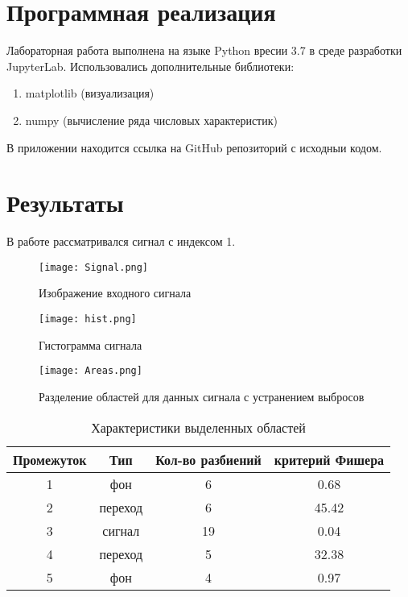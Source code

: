 \documentclass{article}
\begin{document}
\section{Программная реализация}
\noindent Лабораторная работа выполнена на языке Python вресии 3.7 в среде разработки JupyterLab. Использовались дополнительные библиотеки:
 \begin{enumerate}
        \item matplotlib (визуализация)
        \item numpy (вычисление ряда числовых характеристик)
    \end{enumerate}
В приложении находится ссылка на GitHub репозиторий с исходныи кодом.

\section{Результаты}
\noindent В работе рассматривался сигнал с индексом 1.
	\begin{figure}[H]
		\centering
		\texttt{[image: Signal.png]}
		\caption{Изображение входного сигнала}
		\label{fig:sP}
	\end{figure}
	
		\begin{figure}[H]
		\centering
		\texttt{[image: hist.png]}
		\caption{Гистограмма сигнала}
		\label{fig:sP}
	\end{figure}
	
	\begin{figure}[H]
		\centering
		\texttt{[image: Areas.png]}
		\caption{Разделение областей для данных сигнала с устранением выбросов}
		\label{fig:sP}
	\end{figure}

\begin{table}[H]
    \centering
    \begin{tabular}{|c|c|c|c|}
    \hline
        Промежуток & Тип & Кол-во разбиений & критерий Фишера  \\ \hline
        1 & фон & 6 & 0.68\\ \hline
        2 & переход & 6 & 45.42 \\ \hline
        3 & сигнал & 19 & 0.04\\ \hline
        4 & переход & 5 & 32.38\\ \hline
        5 & фон & 4 & 0.97\\ \hline
    \end{tabular}
    \caption{Характеристики выделенных областей}
    \label{tab:my_label}
\end{table}
\end{document}
